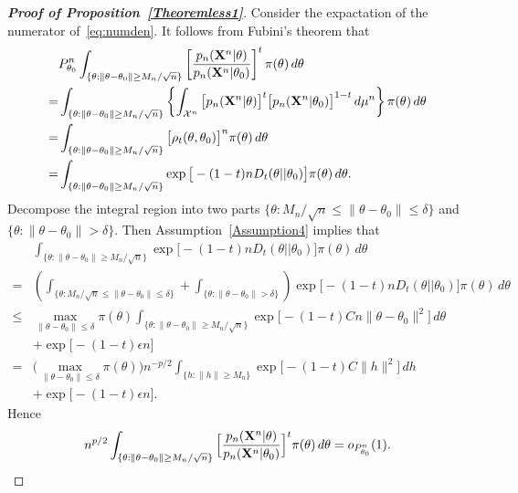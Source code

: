 \documentclass[11pt]{article}
\theoremstyle{plain}
\theoremstyle{definition}
\theoremstyle{remark}
\begin{document}
\begin{appendices}
\begin{proof}[\textbf{Proof of Proposition~\ref{Theoremless1}}]
    Consider the expactation of the numerator of~\ref{eq:numden}.
    It follows from Fubini's theorem that
\begin{align*}
    &P_{\theta_0}^n\int_{\{\theta:\|\theta-\theta_0\|\geq {M_n}/{\sqrt{n}}\} } \left[ \frac{p_n(\mathbf{X}^{n}|\theta)}{p_n(\mathbf{X}^{n}|\theta_0)}  \right]^{t} \pi(\theta) \, d \theta
    \\
    =&
    \int_{\{\theta:\|\theta-\theta_0\|\geq {M_n}/{\sqrt{n}}\} } \left\{\int_{\mathcal{X}^n}\big[ {p_n} (\mathbf{X}^{n}|\theta)\big]^t \big[ p_n (\mathbf{X}^{n}|\theta_0) \big]^{1-t} \, d\mu^n \right\} \pi(\theta) \, d \theta\\
    =&
    \int_{\{\theta:\|\theta-\theta_0\|\geq {M_n}/{\sqrt{n}}\} } \big[ \rho_{t}(\theta,\theta_0) \big]^n \pi(\theta) \, d \theta\\
    = &
    \int_{\{\theta:\|\theta-\theta_0\|\geq {M_n}/{\sqrt{n}}\} } \exp \big[-(1-t) n D_t(\theta||\theta_0) \big] \pi(\theta) \, d \theta.
\end{align*}
    Decompose the integral region into two parts $\{\theta:{M_n}/{\sqrt{n}}\leq \|\theta-\theta_0\|\leq \delta \}$ and $\{\theta: \|\theta-\theta_0\|>\delta\}$.
Then Assumption~\ref{Assumption4} implies that
\begin{align*}
    &\int_{\{\theta:\|\theta-\theta_0\|\geq {M_n}/{\sqrt{n}}\} } 
    \exp \big[ -(1-t) {n} D_t(\theta||\theta_0) \big] \pi(\theta) \, d \theta
    \\
    =&\left(
        \int_{\{\theta:{M_n}/{\sqrt{n}}\leq \|\theta-\theta_0\|\leq \delta \}}
        +
\int_{\{\theta: \|\theta-\theta_0\|>\delta\}}
    \right)
    \exp\big[ -(1-t) {n} D_t(\theta||\theta_0) \big] \pi(\theta) \, d \theta
    \\
    \leq &
    \max_{\|\theta-\theta_0\|\leq \delta}\pi(\theta)
    \int_{\big\{\theta: \|\theta-\theta_0\|\geq {M_n}/{\sqrt{n}} \big\}}
    \exp\big[ -(1-t)C {n} \|\theta-\theta_0\|^2 \big]
    \, d \theta
    \\
    &+
    \exp\big[ -(1-t)\epsilon n\big]
    \\
    =&
    \big(\max_{\|\theta-\theta_0\|\leq \delta}\pi(\theta)\big)
    n^{-p/2}\int_{\big\{h: \|h\|\geq M_n \big\}} \exp\big[-(1-t)C \|h\|^2 \big] \, d h
    \\
    &+
    \exp\big[ -(1-t)\epsilon n\big].
\end{align*}
Hence
\begin{equation}\label{Prop4:eq2}
    n^{p/2}\int_{\{\theta:\|\theta-\theta_0\|\geq {M_n}/{\sqrt{n}}\} } \Big[ \frac{p_n(\mathbf{X}^{n}|\theta)}{p_n(\mathbf{X}^{n}|\theta_0)}  \Big]^{t} \pi(\theta) \, d \theta
    =o_{P^n_{\theta_0}}(1).
\end{equation}


\end{proof}
\end{appendices}
\end{document}
